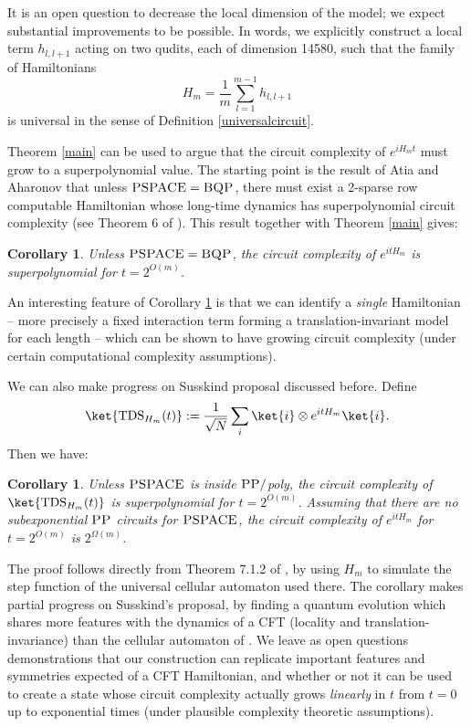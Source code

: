 \documentclass[11pt,letterpaper]{article}
\newtheorem{corollary}[theorem]{Corollary}
\newcommand{\<}{\langle}
\renewcommand{\>}{\rangle}
\begin{document}
It is an open question to decrease the local dimension of the model; we expect substantial improvements to be possible. In words, we explicitly construct a local term $h_{l, l+1}$ acting on two qudits, each of dimension 14580, such that the family of Hamiltonians
\begin{equation}
H_{m} = \frac{1}{m} \sum_{l=1}^{m-1} h_{l, l+1}
\end{equation}
is universal in the sense of Definition \ref{universalcircuit}. 


Theorem \ref{main} can be used to argue that the circuit complexity of $e^{iH_mt}$ must grow to a superpolynomial value. The starting point is the result of Atia and Aharonov that unless $\textsc{PSPACE} = \textsc{BQP}$, there must exist a 2-sparse row computable Hamiltonian whose long-time dynamics has superpolynomial circuit complexity  (see Theorem 6 of \cite{atia2016fast}). This result together with Theorem \ref{main} gives:

\begin{corollary} \label{growingcomplexity}
Unless $\textsc{PSPACE} = \textsc{BQP}$, the circuit complexity of $e^{i t H_m}$ is superpolynomial for $t = 2^{O(m)}$.   
\end{corollary}

An interesting feature of Corollary \ref{growingcomplexity} is that we can identify a \textit{single} Hamiltonian -- more precisely a fixed interaction term forming a translation-invariant model for each length -- which can be shown to have growing circuit complexity (under certain computational complexity assumptions). 

We can also make progress on Susskind proposal discussed before. Define 
\begin{equation}
\ket{\text{TDS}_{H_m}(t)} := \frac{1}{\sqrt{N}} \sum_i \ket{i}\otimes e^{i t H_m} \ket{i}.
\end{equation} 
Then we have:

\begin{corollary} \label{growingcomplexityTDS}
Unless $\textsc{PSPACE}$ is inside $\textsc{PP}/$poly, the circuit complexity of $\ket{\text{TDS}_{H_m}(t)}$ is superpolynomial for $t = 2^{O(m)}$. Assuming that there are no subexponential $\textsc{PP}$ circuits for $\textsc{PSPACE}$,  the circuit complexity of $e^{i t H_m}$ for $t = 2^{O(m)}$ is $2^{\Omega(m)}$.
\end{corollary}

The proof follows directly from Theorem 7.1.2 of \cite{AB}, by using $H_m$ to simulate the step function of the universal cellular automaton used there.  The corollary makes partial progress on Susskind's proposal, by finding a quantum evolution which shares more features with the dynamics of a CFT (locality and translation-invariance) than the cellular automaton of \cite{SA}. We leave as open questions demonstrations that our construction can replicate important features and symmetries expected of a CFT Hamiltonian, and whether or not it can be used to create a state whose circuit complexity actually grows \textit{linearly} in $t$ from $t=0$ up to exponential times (under plausible complexity theoretic assumptions).
\end{document}
